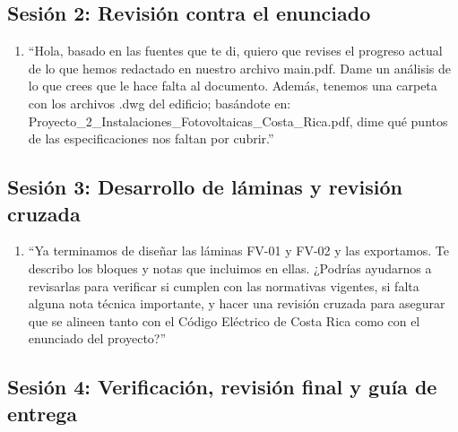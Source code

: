 \subsection*{Sesión 2: Revisión contra el enunciado}

\begin{enumerate}[resume]
    \item ``Hola, basado en las fuentes que te di, quiero que revises el progreso actual de lo que hemos redactado en nuestro archivo main.pdf. Dame un análisis de lo que crees que le hace falta al documento. Además, tenemos una carpeta con los archivos .dwg del edificio; basándote en: Proyecto\_2\_Instalaciones\_Fotovoltaicas\_Costa\_Rica.pdf, dime qué puntos de las especificaciones nos faltan por cubrir.''
\end{enumerate}

\subsection*{Sesión 3: Desarrollo de láminas y revisión cruzada}

\begin{enumerate}[resume]
    \item ``Ya terminamos de diseñar las láminas FV-01 y FV-02 y las exportamos. Te describo los bloques y notas que incluimos en ellas. ¿Podrías ayudarnos a revisarlas para verificar si cumplen con las normativas vigentes, si falta alguna nota técnica importante, y hacer una revisión cruzada para asegurar que se alineen tanto con el Código Eléctrico de Costa Rica como con el enunciado del proyecto?''
\end{enumerate}

\subsection*{Sesión 4: Verificación, revisión final y guía de entrega}

